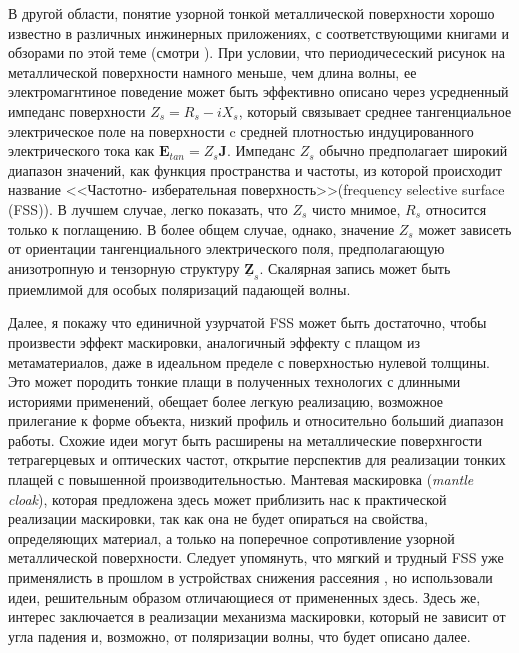 \documentclass[12pt,a4paper]{article}
\begin{document}
В другой области, понятие узорной тонкой металлической поверхности хорошо известно
в различных инжинерных приложениях, с соответствующими книгами и обзорами по этой
теме (смотри \cite{14}). При условии, что периодичесеский рисунок на металлической
поверхности намного меньше, чем длина волны, ее электромагнтиное поведение может
быть эффективно описано через усредненный импеданс поверхности $Z_s = R_s - iX_s$,
который связывает среднее тангенциальное электрическое поле на поверхности c 
средней плотностью индуцированного электрического тока как $\textbf{E}_{tan}=
Z_s\textbf{J}$. Импеданс $Z_s$ обычно предполагает широкий диапазон значений, как
функция пространства и частоты, из которой происходит название <<Частотно-
изберательная поверхность>>(frequency selective surface (FSS)). 
В лучшем случае, легко показать, что $Z_s$ чисто мнимое, $R_s$
относится только к поглащению. В более общем случае, однако, значение $Z_s$ может зависеть от ориентации
тангенциального электрического поля, предполагающую анизотропную и тензорную структуру 
$\underline{\textbf{Z}}_s$. Скалярная запись может быть приемлимой для особых поляризаций падающей волны.

Далее, я покажу что единичной узурчатой FSS может быть достаточно, чтобы произвести эффект маскировки,
аналогичный эффекту с плащом из метаматериалов, даже в идеальном пределе с поверхностью нулевой толщины.
Это может породить тонкие плащи в полученных технологих с длинными историями применений,
обещает более легкую реализацию, возможное прилегание к форме объекта, низкий профиль и относительно
больший диапазон работы. Схожие идеи могут быть расширены на металлические поверхнгости тетрагерцевых
и оптических частот, открытие перспектив для реализации тонких плащей с повышенной производительностью.
Мантевая маскировка (\textit{mantle cloak}), которая предложена здесь может приблизить нас к практической
реализации маскировки, так как она не будет опираться на свойства, определяющих материал, а только на
поперечное сопротивление узорной металлической поверхности. Следует упомянуть, что мягкий и трудный
FSS уже применялисть в прошлом в устройствах снижения рассеяния \cite{15}, но использовали идеи,
решительным образом отличающиеся от примененных здесь. Здесь же, интерес заключается в реализации
механизма маскировки, который не зависит от угла падения и, возможно, от поляризации волны, что будет
описано далее.
\end{document}
